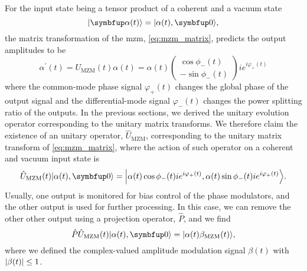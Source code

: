 For the input state being a tensor product of a coherent and a vacuum state
\begin{equation}
	\ket{\vb{\alpha}(t)}
	=
	\ket*{\alpha(t),\vb{0}}
	,
\end{equation}
the matrix transformation of the \gls{mzm}, \cref{eq:mzm_matrix}, predicts the output amplitudes to be
\begin{equation}
	\alpha^\prime(t)
	=
	U_\text{MZM}(t)
	\alpha(t)
	=
	\alpha(t)
	\begin{pmatrix}
		\cos\phi_-(t) \\
		-\sin\phi_-(t)
	\end{pmatrix}
	ie^{i\varphi_+(t)}
	\label{eq:mzm_amplitude_time}
\end{equation}
where the common-mode phase signal $\varphi_+(t)$ changes the global phase of the output signal and the differential-mode signal $\varphi_-(t)$ changes the power splitting ratio of the outputs.
In the previous sections, we derived the unitary evolution operator corresponding to the unitary matrix transforms.
We therefore claim the existence of an unitary operator, $\hat{U}_\text{MZM}$, corresponding to the unitary matrix transform of \cref{eq:mzm_matrix}, where the action of such operator on a coherent and vacuum input state is
\begin{equation}
	\hat{U}_\text{MZM}(t)
	\ket*{\alpha(t),\vb{0}}
	=
	\ket*{\alpha(t)\cos\phi_-(t)ie^{i\varphi_+(t)},\alpha(t)\sin\phi_-(t)ie^{i\varphi_+(t)}}
	.
\end{equation}
Usually, one output is monitored for bias control of the phase modulators, and the other output is used for further processing.
In this case, we can remove the other other output using a projection operator, $\hat{P}$, and we find
\begin{equation}
	\hat{P}
	\hat{U}_\text{MZM}(t)
	\ket*{\alpha(t),\vb{0}}
	=
	\ket*{\alpha(t)\beta_\text{MZM}(t)}
	\label{eq:mzm_state}
	,
\end{equation}
where we defined the complex-valued amplitude modulation signal $\beta(t)$ with $\lvert\beta(t)\rvert\leq 1$.

